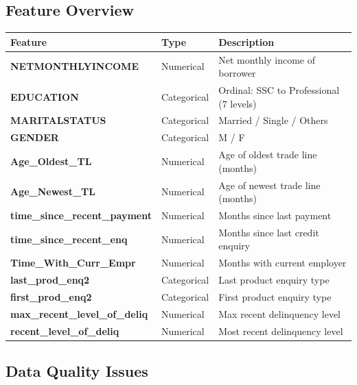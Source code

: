 \documentclass[12pt,a4paper]{article}
\renewcommand{\arraystretch}{1.45}
\begin{document}
\subsection{Feature Overview}

\begin{tcolorbox}[
  enhanced, colback=codebg, colframe=linegray, arc=4pt,
  title={\faTable\quad Key Features in the Merged Dataset},
  fonttitle=\bfseries\small\color{accent},
  attach boxed title to top left={yshift=-2mm, xshift=4mm},
  boxed title style={colback=linegray, colframe=linegray},
  left=4pt, right=4pt,
]
\renewcommand{\arraystretch}{1.3}
\begin{tabular}{>{\bfseries\ttfamily}p{5.6cm} p{2.4cm} p{6.2cm}}
  \textbf{Feature} & \textbf{Type} & \textbf{Description} \\
  \midrule
  NETMONTHLYINCOME           & Numerical   & Net monthly income of borrower \\
  EDUCATION                  & Categorical & Ordinal: SSC to Professional (7 levels) \\
  MARITALSTATUS              & Categorical & Married / Single / Others \\
  GENDER                     & Categorical & M / F \\
  Age\_Oldest\_TL            & Numerical   & Age of oldest trade line (months) \\
  Age\_Newest\_TL            & Numerical   & Age of newest trade line (months) \\
  time\_since\_recent\_payment & Numerical & Months since last payment \\
  time\_since\_recent\_enq   & Numerical   & Months since last credit enquiry \\
  Time\_With\_Curr\_Empr     & Numerical   & Months with current employer \\
  last\_prod\_enq2           & Categorical & Last product enquiry type \\
  first\_prod\_enq2          & Categorical & First product enquiry type \\
  max\_recent\_level\_of\_deliq & Numerical & Max recent delinquency level \\
  recent\_level\_of\_deliq   & Numerical   & Most recent delinquency level \\
\end{tabular}
\end{tcolorbox}

\subsection{Data Quality Issues}
\end{document}
